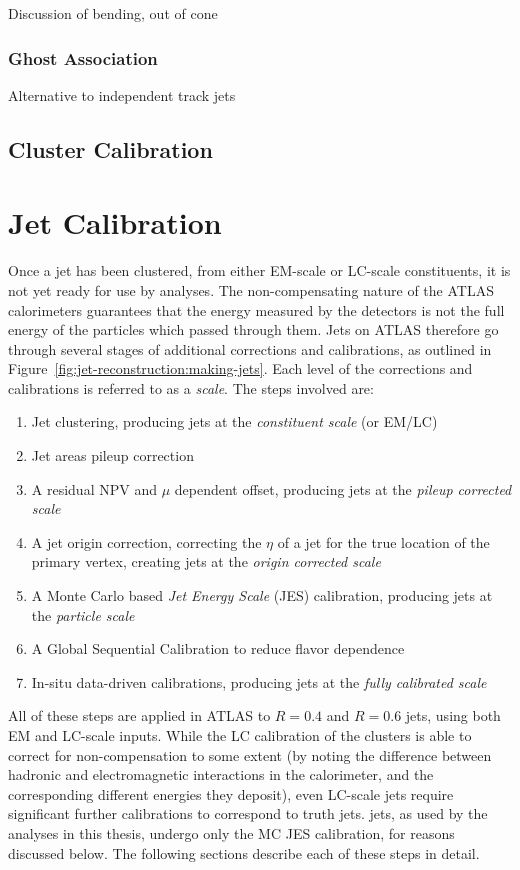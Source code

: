 Discussion of bending, out of cone

\subsubsection{Ghost Association}

Alternative to independent track jets

\subsection{Cluster Calibration}

\section{Jet Calibration}

Once a jet has been clustered, from either EM-scale or LC-scale constituents, it is not yet ready for use by analyses. The non-compensating nature of the ATLAS calorimeters guarantees that the energy measured by the detectors is not the full energy of the particles which passed through them. Jets on ATLAS therefore go through several stages of additional corrections and calibrations, as outlined in Figure~\ref{fig:jet-reconstruction:making-jets}. Each level of the corrections and calibrations is referred to as a \textit{scale}. The steps involved are:

\begin{enumerate}
	\item Jet clustering, producing jets at the \textit{constituent scale} (or EM/LC)
	\item Jet areas pileup correction
	\item A residual NPV and $\mu$ dependent offset, producing jets at the \textit{pileup corrected scale}
	\item A jet origin correction, correcting the $\eta$ of a jet for the true location of the primary vertex, creating jets at the \textit{origin corrected scale}
	\item A Monte Carlo based \textit{Jet Energy Scale} (JES) calibration, producing jets at the \textit{particle scale}
	\item A Global Sequential Calibration to reduce flavor dependence
	\item In-situ data-driven calibrations, producing jets at the \textit{fully calibrated scale}
\end{enumerate}

All of these steps are applied in ATLAS to $R=0.4$ and $R=0.6$ jets, using both EM and LC-scale inputs. While the LC calibration of the clusters is able to correct for non-compensation to some extent (by noting the difference between hadronic and electromagnetic interactions in the calorimeter, and the corresponding different energies they deposit), even LC-scale jets require significant further calibrations to correspond to truth jets. \LargeR jets, as used by the analyses in this thesis, undergo only the MC JES calibration, for reasons discussed below. The following sections describe each of these steps in detail.

